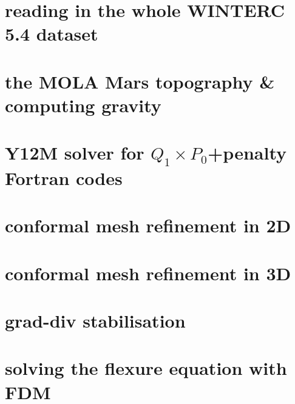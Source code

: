 \documentclass[a4paper,11pt]{report}
\begin{document}
\chapter{reading in the whole WINTERC 5.4 dataset \label{f99}} %

\chapter{the MOLA Mars topography \& computing gravity \label{f100}} %

\chapter{Y12M solver for $Q_1\times P_0$+penalty Fortran codes \label{f101}} %

\chapter{conformal mesh refinement in 2D \label{f102}} %

\chapter{conformal mesh refinement in 3D \label{f103}} %

\chapter{grad-div stabilisation  \label{f104}} %

\chapter{solving the flexure equation with FDM  \label{f105}} %
\end{document}
